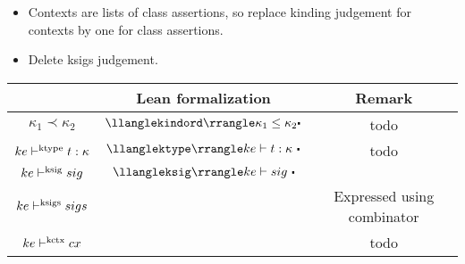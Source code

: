 \begin{itemize}
    \item Contexts are lists of class assertions, so replace kinding judgement for contexts by one for class assertions.
    \item Delete ksigs judgement.
\end{itemize}

\begin{center}
  \begin{tabular}{ccc}
    \toprule
    \citet{Faxen2002staticsemantics} & Lean formalization & Remark \\
    \midrule
    $\kappa_1 \prec \kappa_2$ & $\jkindord{\kappa_1}{\kappa_2}$ & todo \\
    $ke \vdash^{\text{ktype}} t : \kappa$ & $\jktype{ke}{t}{\kappa}$ & todo \\
    $ke \vdash^{\text{ksig}} sig$ & $\jkindsig{ke}{sig}$ & \\
    $ke \vdash^{\text{ksigs}} sigs$ &  & Expressed using combinator \\
    $ke \vdash^{\text{kctx}} cx$ & & todo \\
    \bottomrule
  \end{tabular}
\end{center}
